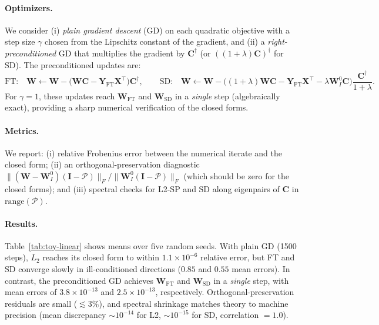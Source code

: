 \paragraph{Optimizers.}
We consider (i) \emph{plain gradient descent} (GD) on each quadratic objective with a step size \(\gamma\) chosen from the Lipschitz constant of the gradient, and (ii) a \emph{right-preconditioned} GD that multiplies the gradient by \(\mathbf C^{\dagger}\) (or \(((1+\lambda)\mathbf C)^{\dagger}\) for SD). The preconditioned updates are:
\[
\text{FT:}\quad
\mathbf W \leftarrow \mathbf W - \big(\mathbf W\mathbf C - \mathbf Y_{\mathrm{FT}}\mathbf X^\top\big)\mathbf C^{\dagger},
\qquad
\text{SD:}\quad
\mathbf W \leftarrow \mathbf W - \big((1+\lambda)\mathbf W\mathbf C - \mathbf Y_{\mathrm{FT}}\mathbf X^\top - \lambda \mathbf W_I^0 \mathbf C\big)\frac{\mathbf C^{\dagger}}{1+\lambda}.
\]
For \(\gamma=1\), these updates reach \(\mathbf W_{\mathrm{FT}}\) and \(\mathbf W_{\mathrm{SD}}\) in a \emph{single} step (algebraically exact), providing a sharp numerical verification of the closed forms.

\paragraph{Metrics.}
We report: (i) relative Frobenius error between the numerical iterate and the closed form;
(ii) an orthogonal-preservation diagnostic
\(\|(\mathbf W-\mathbf W_I^0)(\mathbf I-\mathcal P)\|_F/\|\mathbf W_I^0(\mathbf I-\mathcal P)\|_F\)
(which should be zero for the closed forms);
and (iii) spectral checks for L2-SP and SD along eigenpairs of \(\mathbf C\) in \(\mathrm{range}(\mathcal P)\).

\paragraph{Results.}
Table~\ref{tab:toy-linear} shows means over five random seeds. With plain GD (1500 steps), $L_2$ reaches its closed form to within $1.1\times 10^{-6}$ relative error, but FT and SD converge slowly in ill-conditioned directions ($0.85$ and $0.55$ mean errors). In contrast, the preconditioned GD achieves $\mathbf W_{\mathrm{FT}}$ and $\mathbf W_{\mathrm{SD}}$ in a \emph{single} step, with mean errors of $3.8\times 10^{-13}$ and $2.5\times 10^{-13}$, respectively. Orthogonal-preservation residuals are small ($\lesssim 3\%$), and spectral shrinkage matches theory to machine precision (mean discrepancy $\sim 10^{-14}$ for L2, $\sim 10^{-15}$ for SD, correlation $=1.0$).

